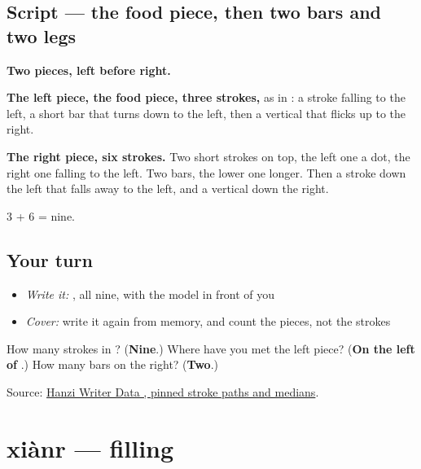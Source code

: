 \subsection*{Script — the food piece, then two bars and two legs}

\begin{quote}
\end{quote}

\textbf{Two pieces, left before right.}

\textbf{The left piece, the food piece, three strokes,} as in : a stroke falling to the left, a short bar that turns down to the left, then a vertical that flicks up to the right.

\textbf{The right piece, six strokes.} Two short strokes on top, the left one a dot, the right one falling to the left. Two bars, the lower one longer. Then a stroke down the left that falls away to the left, and a vertical down the right.

3 + 6 = nine.

\subsection*{Your turn}
\begin{itemize}
\raggedright
  \item \emph{Write it:} , all nine, with the model in front of you
  \item \emph{Cover:} write it again from memory, and count the pieces, not the strokes
\end{itemize}

\begin{tcolorbox}[breakable,colback=teal!4,colframe=teal!35!black,title={Before you move on}]
How many strokes in ? (\textbf{Nine}.) Where have you met the left piece? (\textbf{On the left of }.) How many bars on the right? (\textbf{Two}.)

Source: \href{https://raw.githubusercontent.com/chanind/hanzi-writer-data/68d10a4b21150cae5e1ebbd223eed289cf32d90c/data/\%E9\%A5\%BC.json}{Hanzi Writer Data , pinned stroke paths and medians}.
\end{tcolorbox}
\section[xiànr]{xiànr — filling}

\label{lesson:ZH-C341-xianr}



